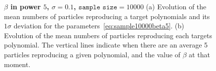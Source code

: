 \documentclass[11pt]{article}
\begin{document}
\begin{enumerate}
	  \begin{figure}[h!]
	  	\centering
	  	\caption{{\bfseries \boldmath $\beta$ in power $5$, $\sigma = 0.1$, $\texttt{sample size} = 10000$} (a) Evolution of the mean numbers of particles reproducing a target polynomials and its $1\sigma$ deviation for the parameters~\eqref{eq:sample10000beta5}. (b) Evolution of the mean numbers of particles reproducing each targets polynomial. The vertical lines indicate when there are an average 5 particles reproducing a given polynomial, and the value of $\beta$ at that moment.}
	  	\label{fig:sample10000beta5}
	  \end{figure}


\end{enumerate}
\end{document}
